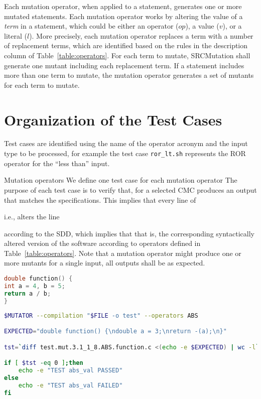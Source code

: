 Each mutation operator, when applied to a statement, generates one or more mutated statements.
Each mutation operator works by altering the value of a \emph{term} in a statement, which could be either an operator  ($op$), a value ($v$), or a literal ($l$). More precisely, each mutation operator replaces a term with a number of replacement terms, which are identified based on the rules in the description column of Table~\ref{table:operators}.
For each term to mutate, SRCMutation shall generate one mutant including each replacement term.
If a statement includes more than one term to mutate, the mutation operator generates a set of mutants for each term to mutate.




\section{Organization of the Test Cases}

Test cases are identified using the name of the operator acronym and the input type to be processed, for example the test case \texttt{ror\_lt.sh} represents the ROR operator for the ``less than'' input.

Mutation operators
We define one test case for each mutation operator 
The purpose of each test case is to verify that, for a selected CMC produces an output that matches the specifications. This implies that every line of

 i.e., alters the line

 according to the SDD, which implies that  that is, the corresponding syntactically altered version of the software according to operators defined in Table~\ref{table:operators}. 
Note that a mutation operator might produce one or more mutants for a single input, all outputs shall be as expected.

\begin{lstlisting}[language=C, label=test_source, caption=C function example.]
double function() {
int a = 4, b = 5;
return a / b;
}
\end{lstlisting}

\begin{lstlisting}[language=bash, label=test_example, caption=ABS test case example.]
$MUTATOR --compilation "$FILE -o test" --operators ABS

EXPECTED="double function() {\ndouble a = 3;\nreturn -(a);\n}"

tst=`diff test.mut.3.1_1_8.ABS.function.c <(echo -e $EXPECTED) | wc -l`

if [ $tst -eq 0 ];then
    echo -e "TEST abs_val PASSED"
else
    echo -e "TEST abs_val FAILED"
fi
\end{lstlisting}



